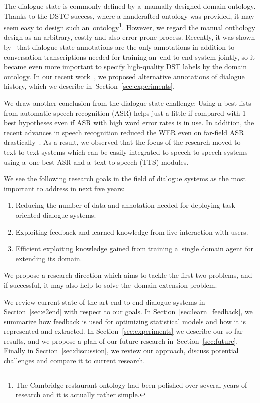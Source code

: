\documentclass[11pt]{article}
\begin{document}
The dialogue state is commonly defined by a~manually designed domain ontology.
Thanks to the DSTC success, where a handcrafted ontology was provided, it may seem easy to design such an~ontology\footnote{The Cambridge restaurant ontology had been polished over several years of research and it is actually rather simple.}.
However, we regard the manual onthology design as an arbitrary, costly and also error prone process.
Recently, it was shown by~\cite{wen_networkbased_2016} that dialogue state annotations are the only annotations in addition to conversation transcriptions needed for training an~end-to-end system jointly, so it became even more important to specify high-quality DST labels by the domain ontology.
In our recent work~\cite{platek2016wochat}, we proposed alternative annotations of dialogue history, which we describe in~Section~\ref{sec:experiments}.

We draw another conclusion from the dialogue state challenge: Using n-best lists from automatic speech recognition (ASR) helps just a little if compared with 1-best hypotheses even if ASR with high word error rates is in use.
In addition, the recent advances in speech recognition reduced the WER even on far-field ASR drastically~\cite{peddinti_jhu_2015,zhang_highway_2016}.
As a result, we observed that the focus of the research moved to text-to-text systems which can be easily integrated to speech to speech systems using a~one-best ASR and a~text-to-speech (TTS) modules.

We see the following research goals in the field of dialogue systems as the most important to address in next five years:
\begin{enumerate}
    \item Reducing the number of data and annotation needed for deploying task-oriented dialogue systems.
    \item Exploiting feedback and learned knowledge from live interaction with users.
    \item Efficient exploiting knowledge gained from training a~single domain agent for extending its domain. 
\end{enumerate}

We propose a research direction which aims to tackle the first two problems, and if successful, it may also help to solve the~domain extension problem.

We review current state-of-the-art end-to-end dialogue systems in Section~\ref{sec:e2end} with respect to our goals.
In Section~\ref{sec:learn_feedback}, we summarize how feedback is used for optimizing statistical models and how it is represented and extracted. 
In Section~\ref{sec:experiments} we describe our so far results, and we propose a plan of our future research in~Section~\ref{sec:future}. 
Finally in Section~\ref{sec:discussion}, we review our approach, discuss potential challenges and compare it to current research.
\end{document}
